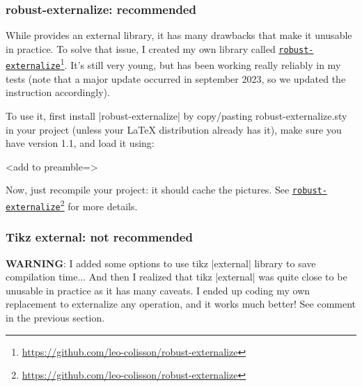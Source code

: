 \documentclass[a4paper,doc2]{ltxdoc} %
\newcommand{\mylink}[2]{\href{#1}{#2}\footnote{\url{#1}}}
\begin{document}
{\subsubsection{robust-externalize: recommended}

While \tikzname{} provides an external library, it has many drawbacks that make it unusable in practice. To solve that issue, I created my own library called \mylink{https://github.com/leo-colisson/robust-externalize}{\texttt{robust-externalize}}. It's still very young, but has been working really reliably in my tests (note that a major update occurred in september 2023, so we updated the instruction accordingly).

To use it, first install |robust-externalize| by copy/pasting robust-externalize.sty in your project (unless your \LaTeX{} distribution already has it), make sure you have version 1.1, and load it using:
\begin{codeexample}
\usepackage{robust-externalize}


\begin{ZX}<add to preamble={\def\name{Alice}}>
  \zxX{\text{\name}}
\end{ZX}
\end{codeexample}

Now, just recompile your project: it should cache the pictures. See \mylink{https://github.com/leo-colisson/robust-externalize}{\texttt{robust-externalize}} for more details.

\subsubsection{Tikz external: not recommended}

\textbf{WARNING}: I added some options to use tikz |external| library to save compilation time... And then I realized that tikz |external| was quite close to be unusable in practice as it has many caveats. I ended up coding my own replacement to externalize any operation, and it works much better! See comment in the previous section.

}
\end{document}
